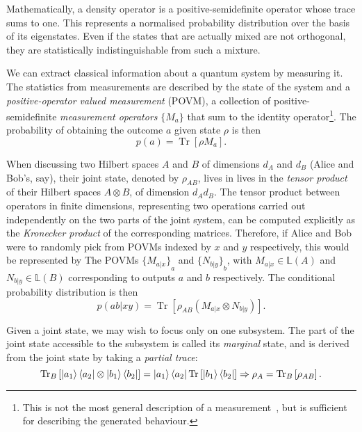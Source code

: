 \documentclass[10pt, a4paper]{article}
\numberwithin{equation}{section} %
\theoremstyle{definition}
\theoremstyle{plain}
\newcommand{\?}{\mathrel{?}} %
\newcommand{\Lin}[1]{\mathbb{L}\left(#1\right)}
\newcommand{\Tr}[2][]{\mathop{\mathrm{Tr}#1}\left[ #2 \right]} %
\begin{document}
\begin{appendices}
                    Mathematically, a density operator is a positive-semidefinite operator whose trace sums to one. This represents a normalised probability distribution over the basis of its eigenstates. Even if the states that are actually mixed are not orthogonal, they are statistically indistinguishable from such a mixture.

                    We can extract classical information about a quantum system by measuring it. The statistics from measurements are described by the state of the system and a \emph{positive-operator valued measurement} (POVM), a collection of positive-semidefinite \emph{measurement operators} \(\{M_a\}\) that sum to the identity operator\footnote{This is not the most general description of a measurement~\cite[Box 2.5]{NielsenChuang}, but is sufficient for describing the generated behaviour.}. The probability of obtaining the outcome \(a\) given state \(\rho\) is then
                    \begin{equation}
                      p(a) = \Tr{\rho M_a}.
                    \end{equation}

                    When discussing two Hilbert spaces \(A\) and \(B\) of dimensions \(d_A\) and \(d_B\) (Alice and Bob's, say), their joint state, denoted by \(\rho_{AB}\), lives in lives in the \emph{tensor product} of their Hilbert spaces \(A \otimes B\), of dimension \(d_A d_B\). The tensor product between operators in finite dimensions, representing two operations carried out independently on the two parts of the joint system, can be computed explicitly as the \emph{Kronecker product} of the corresponding matrices. Therefore, if Alice and Bob were to randomly pick from POVMs indexed by \(x\) and \(y\) respectively, this would be represented by The POVMs \({\{M_{a|x}\}}_a\) and \({\{N_{b|y}\}}_b\), with \(M_{a|x} \in \Lin{A}\) and \(N_{b|y} \in \Lin{B}\) corresponding to outputs \(a\) and \(b\) respectively. The conditional probability distribution is then
                    \begin{equation}
                      p(ab|xy) = \Tr{\rho_{AB} \left(M_{a|x} \otimes N_{b|y}\right) }.
                    \end{equation}

                    Given a joint state, we may wish to focus only on one subsystem. The part of the joint state accessible to the subsystem is called its \emph{marginal} state, and is derived from the joint state by taking a \emph{partial trace}:
                    \begin{equation}
                      \Tr[_B]{\ket{a_1}\bra{a_2} \otimes \ket{b_1}\bra{b_2}} = \ket{a_1}\bra{a_2} \Tr{\ket{b_1}\bra{b_2}} \Rightarrow \rho_A = \Tr[_B]{\rho_{AB}}.
                    \end{equation}


\end{appendices}
\end{document}
